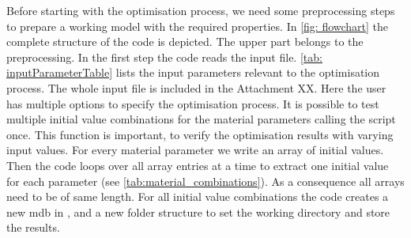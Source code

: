 Before starting with the optimisation process, we need some preprocessing steps to prepare a working  model with the required properties. In \autoref{fig: flowchart} the complete structure of the code is depicted. The upper part belongs to the preprocessing. In the first step the code reads the input file. \autoref{tab: inputParameterTable} lists the input parameters relevant to the optimisation process. The whole input file is included in the Attachment XX. Here the user has multiple options to specify the optimisation process. It is possible to test multiple initial value combinations for the material parameters calling the script once. This function is important, to verify the optimisation results with varying input values. For every material parameter we write an array of initial values. Then the code loops over all array entries at a time to extract one initial value for each parameter (see \autoref{tab:material_combinations}). As a consequence all arrays need to be of same length. For all initial value combinations the code creates a new \acrfull{mdb} in , and a new folder structure to set the working directory and store the results.




